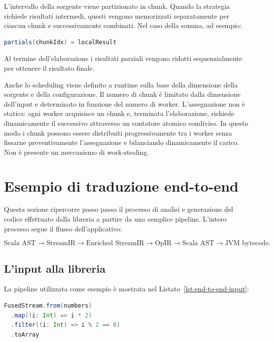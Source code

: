 \documentclass[a4paper,11pt]{report}
\theoremstyle{definition}
\begin{document}
L'intervallo della sorgente viene partizionato in chunk. Quando la strategia richiede risultati intermedi, questi vengono memorizzati separatamente per ciascun chunk e successivamente combinati. Nel caso della somma, ad esempio:

\begin{lstlisting}[language=Scala]
partials(chunkIdx) = localResult
\end{lstlisting}

Al termine dell'elaborazione i risultati parziali vengono ridotti sequenzialmente per ottenere il risultato finale.

Anche lo scheduling viene definito a runtime sulla base della dimensione della sorgente e della configurazione. Il numero di chunk è limitato dalla dimensione dell'input e determinato in funzione del numero di worker. L'assegnazione non è statica: ogni worker acquisisce un chunk e, terminata l'elaborazione, richiede dinamicamente il successivo attraverso un contatore atomico condiviso. In questo modo i chunk possono essere distribuiti progressivamente tra i worker senza fissarne preventivamente l'assegnazione e bilanciando dinamicamente il carico. Non è presente un meccanismo di work-stealing.

\section{Esempio di traduzione end-to-end}
\label{sec:end-to-end}

Questa sezione ripercorre passo passo il processo di analisi e generazione del codice effettuato dalla libreria a partire da una semplice pipeline. L'intero processo segue il flusso dell'applicativo:

\[
  \text{Scala AST}
  \longrightarrow
  \text{StreamIR}
  \longrightarrow
  \text{Enriched StreamIR}
  \longrightarrow
  \text{OpIR}
  \longrightarrow
  \text{Scala AST}
  \longrightarrow
  \text{JVM bytecode}.
\]

\subsection{L'input alla libreria}

La pipeline utilizzata come esempio è mostrata nel Listato~\ref{lst:end-to-end-input}:

\begin{lstlisting}[language=Scala,  label={lst:end-to-end-input}]
FusedStream.from(numbers)
  .map((i: Int) => i * 2)
  .filter((i: Int) => i % 2 == 0)
  .toArray
\end{lstlisting}
\end{document}
